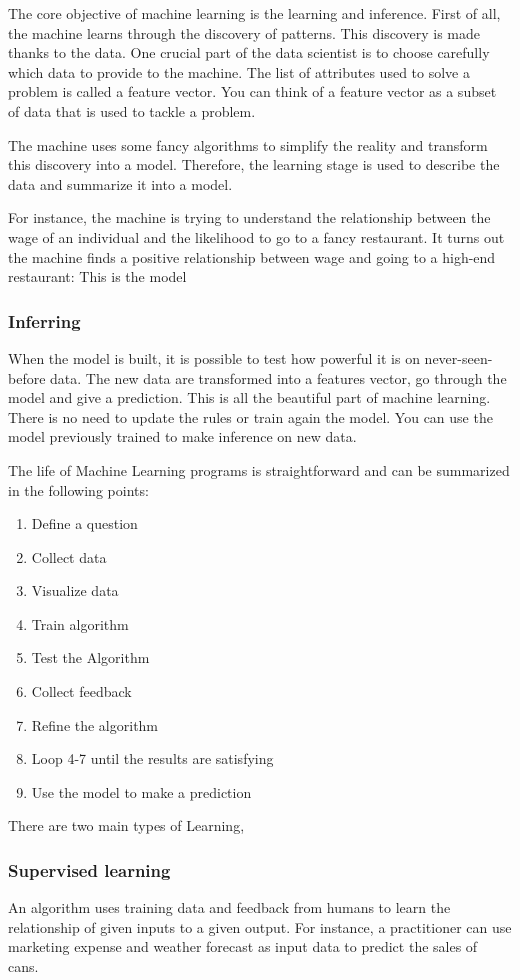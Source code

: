The core objective of machine learning is the learning and inference. First of all, the machine learns through the discovery of patterns. This discovery is made thanks to the data. One crucial part of the data scientist is to choose carefully which data to provide to the machine. The list of attributes used to solve a problem is called a feature vector. You can think of a feature vector as a subset of data that is used to tackle a problem.

The machine uses some fancy algorithms to simplify the reality and transform this discovery into a model. Therefore, the learning stage is used to describe the data and summarize it into a model.

For instance, the machine is trying to understand the relationship between the wage of an individual and the likelihood to go to a fancy restaurant. It turns out the machine finds a positive relationship between wage and going to a high-end restaurant: This is the model

\subsubsection{Inferring}
When the model is built, it is possible to test how powerful it is on never-seen-before data. The new data are transformed into a features vector, go through the model and give a prediction. This is all the beautiful part of machine learning. There is no need to update the rules or train again the model. You can use the model previously trained to make inference on new data.

The life of Machine Learning programs is straightforward and can be summarized in the following points:
\begin{enumerate}
\item Define a question
\item Collect data
\item Visualize data
\item Train algorithm
\item Test the Algorithm
\item Collect feedback
\item Refine the algorithm
\item Loop 4-7 until the results are satisfying
\item Use the model to make a prediction
\end{enumerate}

There are two main types of Learning,
\subsubsection{Supervised learning}
An algorithm uses training data and feedback from humans to learn the relationship of given inputs to a given output. For instance, a practitioner can use marketing expense and weather forecast as input data to predict the sales of cans.

